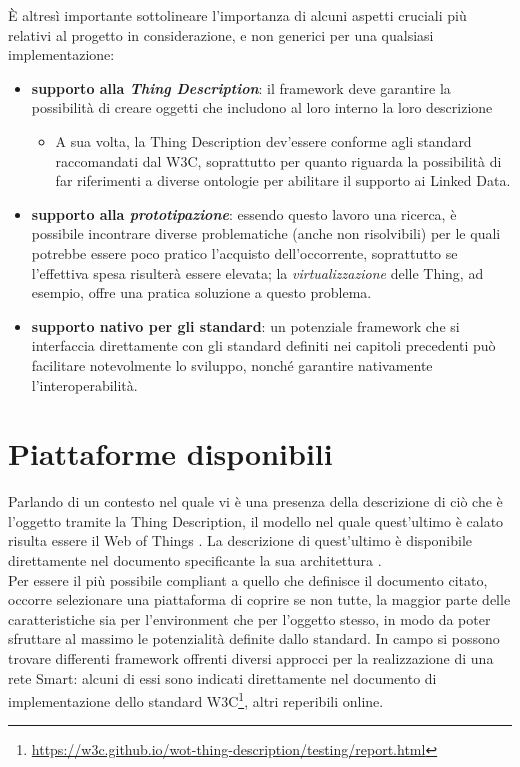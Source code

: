 \documentclass[12pt,a4paper,openright,oneside]{report}
\begin{document}
È altresì importante sottolineare l'importanza di alcuni aspetti cruciali più relativi al progetto in considerazione, e non generici per una qualsiasi implementazione:

\begin{itemize}
	\setlength\itemsep{0em}
	\item \textbf{supporto alla \textit{Thing Description}}: il framework deve garantire la possibilità di creare oggetti che includono al loro interno la loro descrizione
	\begin{itemize}
		\setlength\itemsep{0em}
		\item A sua volta, la Thing Description dev'essere conforme agli standard raccomandati dal W3C, soprattutto per quanto riguarda la possibilità di far riferimenti a diverse ontologie per abilitare il supporto ai Linked Data.
	\end{itemize}

	\item \textbf{supporto alla \textit{prototipazione}}: essendo questo lavoro una ricerca, è possibile incontrare diverse problematiche (anche non risolvibili) per le quali potrebbe essere poco pratico l'acquisto dell'occorrente, soprattutto se l'effettiva spesa risulterà essere elevata; la \textit{virtualizzazione} delle Thing, ad esempio, offre una pratica soluzione a questo problema.
	
	\item \textbf{supporto nativo per gli standard}: un potenziale framework che si interfaccia direttamente con gli standard definiti nei capitoli precedenti può facilitare notevolmente lo sviluppo, nonché garantire nativamente l'interoperabilità.
\end{itemize}

\section{Piattaforme disponibili}
Parlando di un contesto nel quale vi è una presenza della descrizione di ciò che è l'oggetto tramite la Thing Description, il modello nel quale quest'ultimo è calato risulta essere il Web of Things \cite{wot}. La descrizione di quest'ultimo è disponibile direttamente nel documento specificante la sua architettura \cite{wot-architecture}.\\

Per essere il più possibile compliant a quello che definisce il documento citato, occorre selezionare una piattaforma di coprire se non tutte, la maggior parte delle caratteristiche sia per l'environment che per l'oggetto stesso, in modo da poter sfruttare al massimo le potenzialità definite dallo standard. In campo si possono trovare differenti framework offrenti diversi approcci per la realizzazione di una rete Smart: alcuni di essi sono indicati direttamente nel documento di implementazione dello standard W3C\footnote{\url{https://w3c.github.io/wot-thing-description/testing/report.html}}, altri reperibili online.
\end{document}
